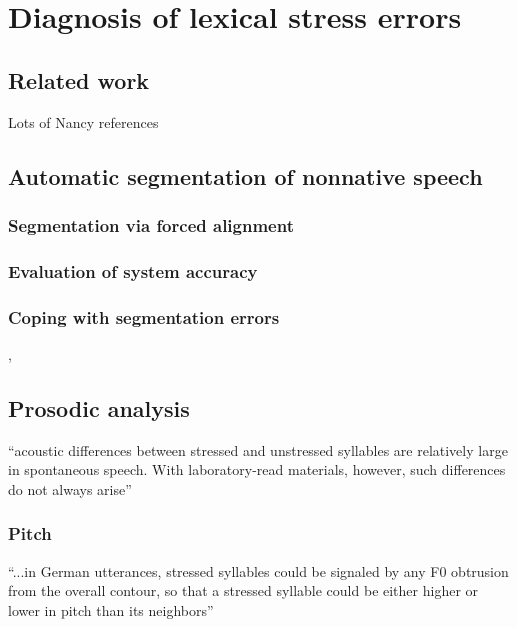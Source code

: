 %
%
\chapter{Diagnosis of lexical stress errors}
\label{chap:diagnosis}



\section{Related work}
\label{sec:diag:related}

	Lots of Nancy references
	
	\cite{Duong2011}
	
	\cite{Probst2002}

\section{Automatic segmentation of nonnative speech}
\label{sec:diag:segmentation}

	\subsection{Segmentation via forced alignment}
	\label{sec:segmentation:alignment}
	
	\subsection{Evaluation of system accuracy}
	\label{sec:segmentation:eval}
	
	\subsection{Coping with segmentation errors}
	\label{sec:segmentation:errors}
		\cite{Mesbahi2011},
		\cite{Orosanu2012}
	
\section{Prosodic analysis}
\label{sec:diag:prosody}
	``acoustic differences between stressed and unstressed syllables are relatively large in spontaneous speech. With laboratory-read materials, however, such differences do not always arise'' \citep[p.~275]{Cutler2005}

	\subsection{Pitch}
	\label{sec:prosody:pitch}
		``...in German utterances, stressed syllables could be signaled by any F0 obtrusion from the overall contour, so that a stressed syllable could be either higher or lower in pitch than its neighbors'' \citep[p.~267]{Cutler2005}
		
